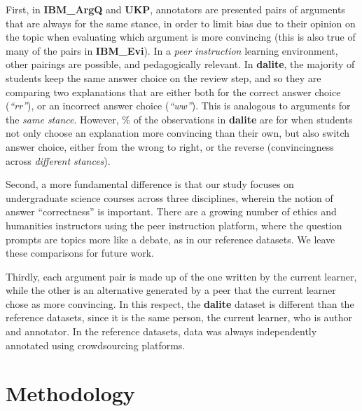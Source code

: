 \documentclass[runningheads]{llncs}
\begin{document}
First, in \textbf{IBM\_ArgQ} and \textbf{UKP}, annotators are presented pairs 
of arguments that are always for the same stance, in order to limit bias due to 
their opinion on the topic when evaluating which argument is more convincing 
(this is also true of many of the pairs in \textbf{IBM\_Evi}).
In a \textit{peer instruction} learning environment, other pairings are 
possible, and pedagogically relevant. 
In \textbf{dalite}, the majority of students keep the same answer choice 
on the review step, and so they are comparing two explanations that 
are either both for the correct answer choice (\textit{``rr''}), or an 
incorrect answer choice (\textit{``ww''}).
This is analogous to arguments for the \textit{same stance}. 
However, \% of the 
observations in \textbf{dalite} are for when students not only choose an 
explanation more convincing than their own, but also switch answer choice, 
either from the wrong to right, or the reverse (convincingness across 
\textit{different stances}).
 
Second, a more fundamental difference is that our study focuses on 
undergraduate science courses across three disciplines, wherein the notion of 
answer ``correctness'' is important.
There are a growing number of ethics and humanities instructors using the peer 
instruction platform, where the question prompts are topics more like a debate, 
as in our reference datasets. 
We leave these comparisons for future work.

Thirdly, each argument pair is made up of the one written by the current 
learner, while the other is an alternative generated by a peer that the current 
learner chose as more convincing. 
In this respect, the \textbf{dalite} dataset is different than the 
reference datasets, since it is the same person, the current learner, who is 
author and annotator. In the reference datasets, data was always independently 
annotated using crowdsourcing platforms.


\section{Methodology}
\end{document}
